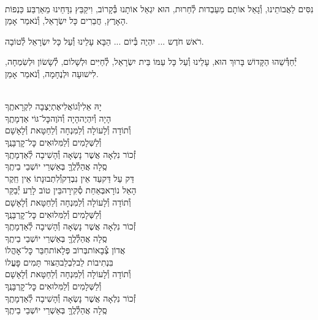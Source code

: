 \documentclass[twoside, openany, parskip=half, 11pt]{book}
\begin{document}
\\
נִסִּים לַאֲבוֹתֵינוּ, וְ֯גָאַל אוֹתָם מֵעַבְדוּת לְ֯חֵרוּת, הוּא יִגְאַל אוֹתָנוּ בְּ֯קָרוֹב, וִיקַבֵּץ נִדָּחֵינוּ מֵאַרְבַּע כַּנְפוֹת הָאָרֶץ, חֲבֵרִים כָּל יִשְׂרָאֵל, וְ֯נֹאמַר אָמֵן.

רֹאשׁ חֹדֶש ... יִהְיֶה בְּ֯יוֹם ... הַבָּא עָלֵינוּ וְ֯עַל כָּל יִשְׂרָאֵל לְ֯טוֹבָה.

יְ֯חַדְּ֯שֵׁהוּ הַקָּדוֹשׁ בָּרוּךְ הוּא, עָלֵינוּ וְ֯עַל כָּל עַמּוֹ בֵּית יִשְׂרָאֵל, לְ֯חַיִּים וּלְשָׁלוֹם, לְ֯שָׂשׂוֹן וּלְשִׂמְחָה, לִישׁוּעָה וּלְנֶחָמָה, וְ֯נֹאמַר אָמֵן.

\begin{sometimes}
\negline
\begin{narrow}
\\
יָהּ אֵלִי\hfill וְ֯גוֹאֲלִי\hfill אֶתְיַצְבָה לִקְרָאתֶֽךָ\\
הָיָה וְ֯יִהְיֶה\hfill הָיָה וְ֯הֹוֶה\hfill כׇּל־גּוֹי אַדְמָתֶֽךָ\\

וְ֯תוֹדָה וְ֯לָעוֹלָה וְ֯לַמִּנְחָה וְ֯לַחַטָּאת וְ֯לָאָשָׁם \\
וְ֯לַשְּׁלָמִים וְ֯לַמִּלוּאִים כׇּל־קׇרְבָּנֶֽךָ\\
זְ֯כוֹר נִלְאָה אֲשֶׁר נָשְׂאָה וְ֯הָשִׁיבָה לְ֯אַדְמָתֶֽךָ\\
סֶֽלָה אֲהַלְ֯לֶֽךָּ בְּאַשְׁרֵי יוֹשְׁבֵי בֵיתֶֽךָ\\

דַּק עַל דַּק\hfill עַד אֵין נִבְדַק\hfill וְ֯לִתְבוּנָתוֹ אֵין חֵֽקֶר\\
הָאֵל נוֹרָא\hfill בְּאַחַת סְ֯קִירָה\hfill בֵּין טוֹב לָרַע יְ֯בַקֵּר\\

וְ֯תוֹדָה וְ֯לָעוֹלָה וְ֯לַמִּנְחָה וְ֯לַחַטָּאת וְ֯לָאָשָׁם \\
וְ֯לַשְּׁלָמִים וְ֯לַמִּלוּאִים כׇּל־קׇרְבָּנֶֽךָ\\
זְ֯כוֹר נִלְאָה אֲשֶׁר נָשְׂאָה וְ֯הָשִׁיבָה לְ֯אַדְמָתֶֽךָ\\
סֶֽלָה אֲהַלְ֯לֶֽךָּ בְּאַשְׁרֵי יוֹשְׁבֵי בֵיתֶֽךָ\\

אֲדוֹן צְ֯בָאוֹת\hfill בְּרוֹב פְּלָאוֹת\hfill חִבֵּר כׇּל־אׇהֳלוֹ\\
בִּנְתִיבוֹת לֵב\hfill לִבְלֵב\hfill הַצּוּר תָּמִים פׇּעֳלוֹ\\

וְ֯תוֹדָה וְ֯לָעוֹלָה וְ֯לַמִּנְחָה וְ֯לַחַטָּאת וְ֯לָאָשָׁם \\
וְ֯לַשְּׁלָמִים וְ֯לַמִּלוּאִים כׇּל־קׇרְבָּנֶֽךָ\\
זְ֯כוֹר נִלְאָה אֲשֶׁר נָשְׂאָה וְ֯הָשִׁיבָה לְ֯אַדְמָתֶֽךָ\\
סֶֽלָה אֲהַלְ֯לֶֽךָּ בְּאַשְׁרֵי יוֹשְׁבֵי בֵיתֶֽךָ
\end{narrow}

\end{sometimes}
\end{document}
